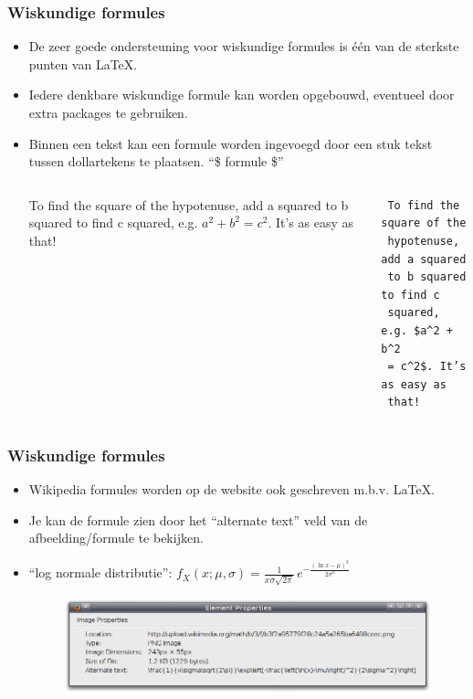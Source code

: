 \documentclass{beamer}
\begin{document}

\begin{frame}[fragile]
\frametitle{Wiskundige formules}
\begin{itemize}
 \item De zeer goede ondersteuning voor wiskundige formules is \'e\'en van de sterkste punten van \LaTeX.
 \item Iedere denkbare wiskundige formule kan worden opgebouwd, eventueel door extra packages te gebruiken.
 \item Binnen een tekst kan een formule worden ingevoegd door een stuk tekst tussen dollartekens te plaatsen. ``\$ formule \$''
\begin{columns}[c] 
To find the square of the hypotenuse, add a squared to b squared to find c squared, e.g. $a^2 + b^2 = c^2$. It’s as easy as that!
\begin{verbatim}
 To find the square of the 
 hypotenuse, add a squared 
 to b squared to find c 
 squared, e.g. $a^2 + b^2 
 = c^2$. It’s as easy as 
 that!
\end{verbatim}
\end{columns}
\end{itemize}
\end{frame}


\begin{frame}
\frametitle{Wiskundige formules}
\begin{itemize}
 \item Wikipedia formules worden op de website ook geschreven m.b.v. \LaTeX.
 \item Je kan de formule zien door het ``alternate text'' veld van de afbeelding/formule te bekijken.
 \item ``log normale distributie'': $f_X(x;\mu,\sigma) = \frac{1}{x \sigma \sqrt{2 \pi}}\, e^{-\frac{(\ln x - \mu)^2}{2\sigma^2}}$
  \begin{figure}[h] 
    \includegraphics[width=1\textwidth]{images/formulewiki.png}
  \end{figure}
 \end{itemize}
\end{frame}
\end{document}
